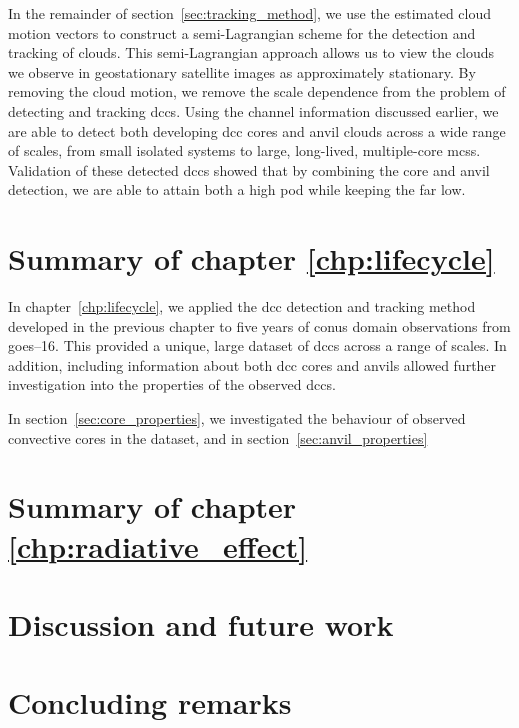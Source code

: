 In the remainder of section~\ref{sec:tracking_method}, we use the estimated cloud motion vectors to construct a semi-Lagrangian scheme for the detection and tracking of clouds.
This semi-Lagrangian approach allows us to view the clouds we observe in geostationary satellite images as approximately stationary.
By removing the cloud motion, we remove the scale dependence from the problem of detecting and tracking \acrshort{dcc}s.
Using the channel information discussed earlier, we are able to detect both developing \acrshort{dcc} cores and anvil clouds across a wide range of scales, from small isolated systems to large, long-lived, multiple-core \acrshort{mcs}s.
Validation of these detected \acrshort{dcc}s showed that by combining the core and anvil detection, we are able to attain both a high \acrshort{pod} while keeping the \acrshort{far} low.

\section{Summary of chapter \ref{chp:lifecycle}}

In chapter~\ref{chp:lifecycle}, we applied the \acrshort{dcc} detection and tracking method developed in the previous chapter to five years of \acrshort{conus} domain observations from \acrshort{goes}--16.
This provided a unique, large dataset of \acrshort{dcc}s across a range of scales.
In addition, including information about both \acrshort{dcc} cores and anvils allowed further investigation into the properties of the observed \acrshort{dcc}s.

In section~\ref{sec:core_properties}, we investigated the behaviour of observed convective cores in the dataset, and in section~\ref{sec:anvil_properties}





\section{Summary of chapter \ref{chp:radiative_effect}}




\section{Discussion and future work}




\section{Concluding remarks}